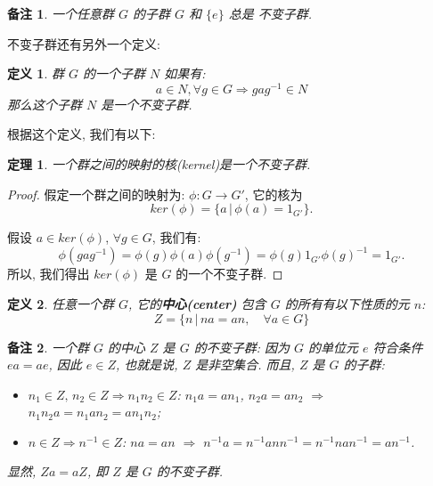 \documentclass[utf8]{ctexbook}
\newtheorem{theorem}{定理}[section]
\newtheorem{definition}{定义}[section]
\newtheorem{memo}{备注}[section]
\begin{document}
\begin{memo}
一个任意群 $G$ 的子群 $G$ 和 $\{e\}$ 总是 不变子群.
\end{memo}

不变子群还有另外一个定义:
\begin{definition}
群 $G$ 的一个子群 $N$ 如果有:
\begin{equation}
a \in N , \forall g \in G \Rightarrow g a g^{-1} \in N 
\end{equation}
那么这个子群 $N$ 是一个不变子群.
\end{definition}

根据这个定义, 我们有以下:

\begin{theorem}\label{thm_kernal_normal_subgroup}
一个群之间的映射的核(kernel)是一个不变子群.
\end{theorem}

\begin{proof}
假定一个群之间的映射为: $\phi: G \rightarrow G'$, 它的核为 
$$ker(\phi) = \{ a \, | \, \phi(a) = 1_{G'} \} . $$

假设 $a \in ker(\phi)$, $\forall g \in G$, 我们有:
$$ \phi(g a g^{-1}) = \phi(g) \phi(a) \phi(g^{-1}) = \phi(g) 1_{G'} \phi(g)^{-1} = 1_{G'} . $$
所以, 我们得出 $ker(\phi)$ 是 $G$ 的一个不变子群.

\end{proof}


\begin{definition}
任意一个群 $G$, 它的\textbf{中心(center)} 包含 $G$ 的所有有以下性质的元 $n$:
\begin{equation}
Z = \{ n \, | \, na=an, \quad \forall a \in G \} \label{eq_group_center}
\end{equation}
\end{definition}


\begin{memo}
一个群 $G$ 的中心 $Z$ 是 $G$ 的不变子群: 因为 $G$ 的单位元 $e$ 符合条件 $ea = ae$, 因此 $e \in Z$, 也就是说, $Z$ 是非空集合. 而且, $Z$ 是 $G$ 的子群:
\begin{itemize}
\item{$n_1 \in Z, \, n_2 \in Z \Rightarrow n_1 n_2 \in Z$: $n_1 a = a n_1$, $n_2 a = a n_2$ $\Rightarrow$ $n_1 n_2 a = n_1 a n_2 = a n_1 n_2$;}
\item{$n \in Z \Rightarrow n^{-1} \in Z $: $n a =  a n $ $\Rightarrow$ $n^{-1} a = n^{-1} a n n^{-1} = n^{-1} n a n^{-1} = a n^{-1}$. }
\end{itemize} 


显然, $Za=aZ$, 即 $Z$ 是 $G$ 的不变子群.


\end{memo}
\end{document}
